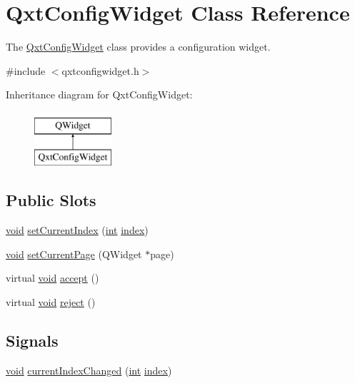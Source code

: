 \hypertarget{class_qxt_config_widget}{\section{Qxt\-Config\-Widget Class Reference}
\label{class_qxt_config_widget}
}


The \hyperlink{class_qxt_config_widget}{Qxt\-Config\-Widget} class provides a configuration widget.  




{\ttfamily \#include $<$qxtconfigwidget.\-h$>$}

Inheritance diagram for Qxt\-Config\-Widget\-:\begin{figure}[H]
\begin{center}
\leavevmode
\includegraphics[height=2.000000cm]{class_qxt_config_widget}
\end{center}
\end{figure}
\subsection*{Public Slots}
\begin{DoxyCompactItemize}
\item 
\hyperlink{group___u_a_v_objects_plugin_ga444cf2ff3f0ecbe028adce838d373f5c}{void} \hyperlink{class_qxt_config_widget_a3cf3dc3d8ab0704e805e2af7f81f7785}{set\-Current\-Index} (\hyperlink{ioapi_8h_a787fa3cf048117ba7123753c1e74fcd6}{int} \hyperlink{glext_8h_ab47dd9958bcadea08866b42bf358e95e}{index})
\item 
\hyperlink{group___u_a_v_objects_plugin_ga444cf2ff3f0ecbe028adce838d373f5c}{void} \hyperlink{class_qxt_config_widget_a23e01238f5a096a7c0528cf9d954138e}{set\-Current\-Page} (Q\-Widget $\ast$page)
\item 
virtual \hyperlink{group___u_a_v_objects_plugin_ga444cf2ff3f0ecbe028adce838d373f5c}{void} \hyperlink{class_qxt_config_widget_a0fc0dbb89cb3b454b2870e13b564c9d7}{accept} ()
\item 
virtual \hyperlink{group___u_a_v_objects_plugin_ga444cf2ff3f0ecbe028adce838d373f5c}{void} \hyperlink{class_qxt_config_widget_a647799331f5347c0083f4bf193151af8}{reject} ()
\end{DoxyCompactItemize}
\subsection*{Signals}
\begin{DoxyCompactItemize}
\item 
\hyperlink{group___u_a_v_objects_plugin_ga444cf2ff3f0ecbe028adce838d373f5c}{void} \hyperlink{class_qxt_config_widget_a800c337df5208b55bd8a98aa62d6254b}{current\-Index\-Changed} (\hyperlink{ioapi_8h_a787fa3cf048117ba7123753c1e74fcd6}{int} \hyperlink{glext_8h_ab47dd9958bcadea08866b42bf358e95e}{index})
\end{DoxyCompactItemize}
